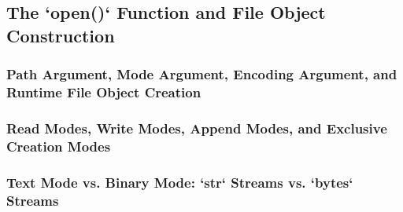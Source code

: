\subsection{The `open()` Function and File Object Construction}
\subsubsection{Path Argument, Mode Argument, Encoding Argument, and Runtime File Object Creation}
\subsubsection{Read Modes, Write Modes, Append Modes, and Exclusive Creation Modes}
\subsubsection{Text Mode vs. Binary Mode: `str` Streams vs. `bytes` Streams}
